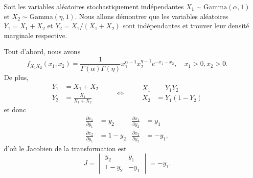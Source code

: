 \begin{exemple}
  \label{ex:transformations:gamma}
  Soit les variables aléatoires stochastiquement indépendantes $X_1 \sim
  \text{Gamma}(\alpha, 1)$ et $X_2 \sim \text{Gamma}(\eta, 1)$. Nous allons
  démontrer que les variables aléatoires $Y_1 = X_1 + X_2$ et $Y_2 =
  X_1/(X_1 + X_2)$ sont indépendantes et trouver leur densité
  marginale respective.

  Tout d'abord, nous avons
  \begin{displaymath}
    f_{X_1 X_2}(x_1, x_2) = \frac{1}{\Gamma(\alpha) \Gamma(\eta)}
    x_1^{\alpha - 1} x_2^{\eta - 1} e^{-x_1 - x_2}, \quad
    x_1 > 0, x_2 > 0.
  \end{displaymath}
  De plus,
  \begin{displaymath}
    \begin{aligned}
      Y_1 &= X_1 + X_2 \\
      Y_2 &= \frac{X_1}{X_1 + X_2}
    \end{aligned}
    \qquad \Leftrightarrow \qquad
    \begin{aligned}
      X_1 &= Y_1 Y_2 \\
      X_2 &= Y_1(1 - Y_2)
    \end{aligned}
  \end{displaymath}
  et donc
  \begin{align*}
    \frac{\partial x_1}{\partial y_1} &= y_2 &
    \frac{\partial x_1}{\partial y_2} &= y_1 \\
    \frac{\partial x_2}{\partial y_1} &= 1 - y_2 &
    \frac{\partial x_2}{\partial y_2} &= - y_1,
  \end{align*}
  d'où le Jacobien de la transformation est
  \begin{displaymath}
    J =
    \begin{vmatrix}
      y_2 & y_1 \\
      1 - y_2 & -y_1
    \end{vmatrix}
    = - y_1.
  \end{displaymath}


\end{exemple}
